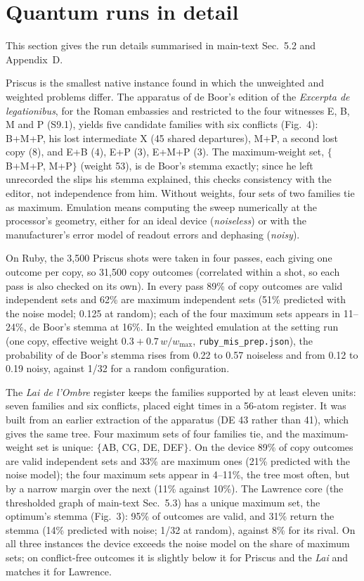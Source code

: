 \documentclass[11pt,a4paper]{article}
\theoremstyle{remark}
\begin{document}
\section{Quantum runs in detail}
\label{app:quantumruns}
This section gives the run details summarised in main-text Sec.~5.2 and Appendix~D.

Priscus is the smallest native instance found in which the unweighted and weighted problems differ. The apparatus of de Boor's edition of the \emph{Excerpta de legationibus}, for the Roman embassies and restricted to the four witnesses E, B, M and P (S9.1), yields five candidate families with six conflicts (Fig.~4): B+M+P, his lost intermediate X (45 shared departures), M+P, a second lost copy (8), and E+B (4), E+P (3), E+M+P (3). The maximum-weight set, $\{$B+M+P, M+P$\}$ (weight 53), is de Boor's stemma exactly; since he left unrecorded the slips his stemma explained, this checks consistency with the editor, not independence from him. Without weights, four sets of two families tie as maximum. Emulation means computing the sweep numerically at the processor's geometry, either for an ideal device (\emph{noiseless}) or with the manufacturer's error model of readout errors and dephasing (\emph{noisy}).

On Ruby, the 3{,}500 Priscus shots were taken in four passes, each giving one outcome per copy, so 31{,}500 copy outcomes (correlated within a shot, so each pass is also checked on its own). In every pass 89\% of copy outcomes are valid independent sets and 62\% are maximum independent sets (51\% predicted with the noise model; 0.125 at random); each of the four maximum sets appears in 11--24\%, de Boor's stemma at 16\%. In the weighted emulation at the setting run (one copy, effective weight $0.3+0.7\,w/w_{\max}$, \texttt{ruby\_mis\_prep.json}), the probability of de Boor's stemma rises from 0.22 to 0.57 noiseless and from 0.12 to 0.19 noisy, against 1/32 for a random configuration.

The \emph{Lai de l'Ombre} register keeps the families supported by at least eleven units: seven families and six conflicts, placed eight times in a 56-atom register. It was built from an earlier extraction of the apparatus (DE 43 rather than 41), which gives the same tree. Four maximum sets of four families tie, and the maximum-weight set is unique: $\{$AB, CG, DE, DEF$\}$. On the device 89\% of copy outcomes are valid independent sets and 33\% are maximum ones (21\% predicted with the noise model); the four maximum sets appear in 4--11\%, the tree most often, but by a narrow margin over the next (11\% against 10\%). The Lawrence core (the thresholded graph of main-text Sec.~5.3) has a unique maximum set, the optimum's stemma (Fig.~3): 95\% of outcomes are valid, and 31\% return the stemma (14\% predicted with noise; 1/32 at random), against 8\% for its rival. On all three instances the device exceeds the noise model on the share of maximum sets; on conflict-free outcomes it is slightly below it for Priscus and the \emph{Lai} and matches it for Lawrence.
\end{document}
